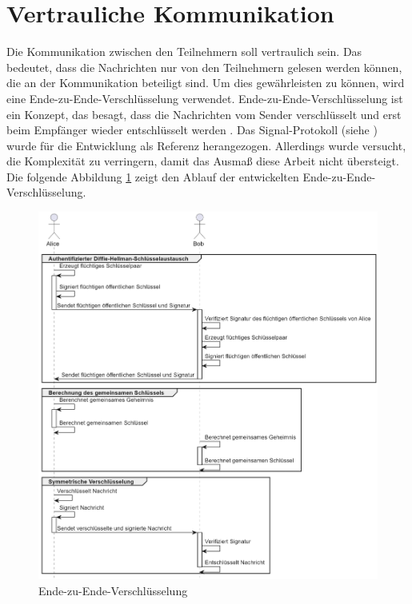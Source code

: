 \section{Vertrauliche Kommunikation}
\label{subsec:vertrauliche_kommunikation}

Die Kommunikation zwischen den Teilnehmern soll vertraulich sein. Das bedeutet, dass die Nachrichten nur von den Teilnehmern gelesen werden können, die an der Kommunikation beteiligt sind. Um dies gewährleisten zu können, wird eine Ende-zu-Ende-Verschlüsselung verwendet. Ende-zu-Ende-Verschlüsselung ist ein Konzept, das besagt, dass die Nachrichten vom Sender verschlüsselt und erst beim Empfänger wieder entschlüsselt werden \parencite[S. 233-260]{Wong_KryptoPraxis}. Das Signal-Protokoll (siehe \cite{Signal_Docs}) wurde für die Entwicklung als Referenz herangezogen. Allerdings wurde versucht, die Komplexität zu verringern, damit das Ausmaß diese Arbeit nicht übersteigt. Die folgende Abbildung \ref{fig:ende_zu_ende} zeigt den Ablauf der entwickelten Ende-zu-Ende-Verschlüsselung.


\begin{figure}[H]
    \centering
    \includegraphics[width=1\linewidth]{images/end2end.png}
    \caption{Ende-zu-Ende-Verschlüsselung}
    \label{fig:ende_zu_ende}
\end{figure}


